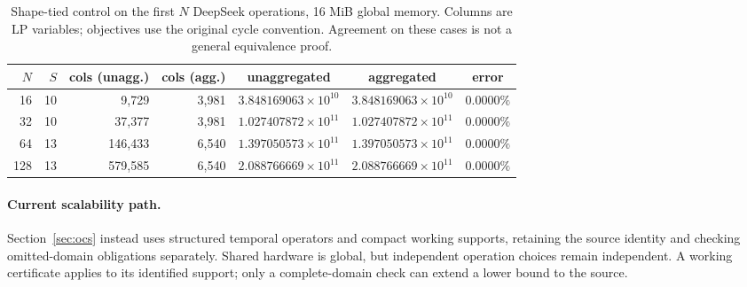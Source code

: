 \begin{table}[ht!]
\centering
\small
\caption{Shape-tied control on the first $N$ DeepSeek operations,
16 MiB global memory. Columns are LP variables; objectives use the original
cycle convention. Agreement on these cases is not a general equivalence proof.}
\label{tab:agg_validation}
\begin{tabular}{@{}rrrrccc@{}}
\toprule
$N$ & $S$ & cols (unagg.) & cols (agg.) & unaggregated & aggregated & error \\
\midrule
16  & 10 & 9{,}729   & 3{,}981 & $3.848169063\times10^{10}$ & $3.848169063\times10^{10}$ & $0.0000\%$ \\
32  & 10 & 37{,}377  & 3{,}981 & $1.027407872\times10^{11}$ & $1.027407872\times10^{11}$ & $0.0000\%$ \\
64  & 13 & 146{,}433 & 6{,}540 & $1.397050573\times10^{11}$ & $1.397050573\times10^{11}$ & $0.0000\%$ \\
128 & 13 & 579{,}585 & 6{,}540 & $2.088766669\times10^{11}$ & $2.088766669\times10^{11}$ & $0.0000\%$ \\
\bottomrule
\end{tabular}
\end{table}

\paragraph{Current scalability path.}
Section~\ref{sec:ocs} instead uses structured temporal operators and compact
working supports, retaining the source identity and checking omitted-domain
obligations separately. Shared hardware is global, but independent operation
choices remain independent. A working certificate applies to its identified
support; only a complete-domain check can extend a lower bound to the source.
